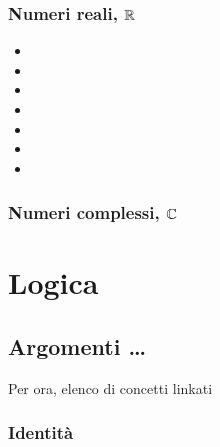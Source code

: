 \documentclass[letterpaper,10pt,italian]{jupyterBook}
\begin{document}
\subsection{Numeri reali, \protect\(\mathbb{R}\protect\)}
\label{\detokenize{ch/set:numeri-reali-mathbb-r}}\label{\detokenize{ch/set:math-hs-set-numbers-r}}\begin{itemize}
\item {} 
\sphinxAtStartPar
{}

\item {} 
\sphinxAtStartPar
{}

\item {} 
\sphinxAtStartPar
{}

\item {} 
\sphinxAtStartPar
{}

\item {} 
\sphinxAtStartPar
{}

\item {} 
\sphinxAtStartPar
{}

\item {} 
\sphinxAtStartPar
{}

\end{itemize}


\subsection{Numeri complessi, \protect\(\mathbb{C}\protect\)}
\label{\detokenize{ch/set:numeri-complessi-mathbb-c}}\label{\detokenize{ch/set:math-hs-set-numbers-c}}
\sphinxstepscope


\chapter{Logica}
\label{\detokenize{ch/logics:logica}}\label{\detokenize{ch/logics:math-hs-logics}}\label{\detokenize{ch/logics::doc}}

\section{Argomenti …}
\label{\detokenize{ch/logics:argomenti}}
\sphinxAtStartPar
Per ora, elenco di concetti linkati


\subsection{Identità}
\label{\detokenize{ch/logics:logics-identity}}\label{\detokenize{ch/logics:identita}}
\end{document}
